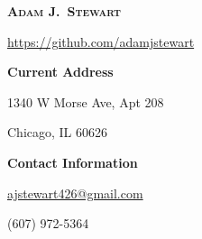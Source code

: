 
\begin{center}

    \textbf{\textsc{\Large Adam J.\ Stewart}}

    \href{https://github.com/adamjstewart}{https://github.com/adamjstewart}

\end{center}

\vspace{-12pt}

\begin{multicols}{2}

    \begin{flushleft}

        \textbf{Current Address}

        1340 W Morse Ave, Apt 208

        Chicago, IL 60626

    \end{flushleft}

    \columnbreak

    \begin{flushright}

        \textbf{Contact Information}

        \href{mailto:ajstewart426@gmail.com}{ajstewart426@gmail.com}

        (607) 972-5364

    \end{flushright}

\end{multicols}

